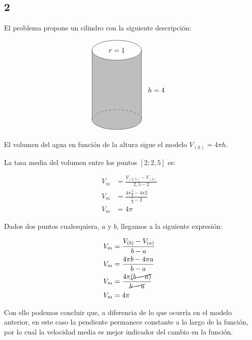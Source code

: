 \subsection*{2}

El problema propone un cilindro con la siguiente descripción:

\begin{align*}
\begin{tikzpicture}
\draw (0,0) ellipse (1.25 and 0.5);
\draw (-1.25,0) -- (-1.25,-3.5);
\draw (-1.25,-3.5) arc (180:360:1.25 and 0.5);
\draw [dashed] (-1.25,-3.5) arc (180:360:1.25 and -0.5);
\draw (1.25,-3.5) -- (1.25,0);  
\fill [gray,opacity=0.5] (-1.25,0) -- (-1.25,-3.5) arc (180:360:1.25 and 0.5) -- (1.25,0) arc (0:180:1.25 and -0.5);
\draw (2,-2) node{$h = 4$};
\draw (0,0) node{$r = 1$};
\end{tikzpicture}
\end{align*}

El volumen del agua en función de la altura sigue el modelo $V_{(h)} = 4\pi h$. 

La tasa media del volumen entre los puntos $[2;2,5]$ es:

\begin{align*}
    V_m &= \frac{V_{(2,5)} - V_{(2)}}{2,5-2}\\
    V_m &= \frac{4\pi\frac{5}{2} - 4\pi 2}{\frac{5}{2}-2}\\
    V_m &= 4\pi
\end{align*}

Dados dos puntos cualesquiera, $a$ y $b$, llegamos a la siguiente expresión:

\begin{align*}
    V_m &= \frac{V_{(b)} - V_{(a)}}{b-a}\\
    V_m &= \frac{4\pi b - 4\pi a}{b-a}\\
    V_m &= \frac{4\pi \cancel{(b - a)}}{\cancel{b-a}}\\
    V_m &= 4\pi
\end{align*}

Con ello podemos concluir que, a diferencia de lo que ocurría en el modelo anterior, en este caso la pendiente permanece constante a lo largo de la función, por lo cual la velocidad media es mejor indicador del cambio en la función.